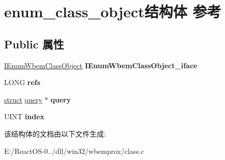 \hypertarget{structenum__class__object}{}\section{enum\+\_\+class\+\_\+object结构体 参考}
\label{structenum__class__object}
\subsection*{Public 属性}
\begin{DoxyCompactItemize}
\item 
\mbox{\label{structenum__class__object_a7928c3d8d3e527c558494c3cea50f57e}} 
\hyperlink{interface_i_enum_wbem_class_object}{I\+Enum\+Wbem\+Class\+Object} {\bfseries I\+Enum\+Wbem\+Class\+Object\+\_\+iface}
\item 
\mbox{\label{structenum__class__object_aa3f24e9b5a299a0c78d013b431d71873}} 
L\+O\+NG {\bfseries refs}
\item 
\mbox{\label{structenum__class__object_aac7757d236b2a6e5524a5721b3400bf6}} 
\hyperlink{interfacestruct}{struct} \hyperlink{structquery}{query} $\ast$ {\bfseries query}
\item 
\mbox{\label{structenum__class__object_a96727fc127aa0686d7c537818ebabc8a}} 
U\+I\+NT {\bfseries index}
\end{DoxyCompactItemize}


该结构体的文档由以下文件生成\+:\begin{DoxyCompactItemize}
\item 
E\+:/\+React\+O\+S-\/0../dll/win32/wbemprox/class.\+c\end{DoxyCompactItemize}
